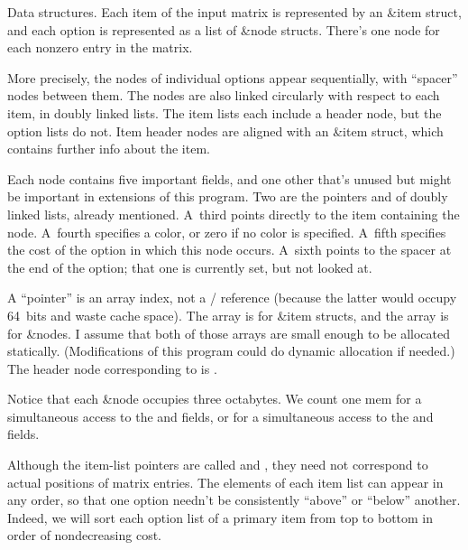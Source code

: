 Data structures.
Each item of the input matrix is represented by an \&{item} struct,
and each option is represented as a list of \&{node} structs. There's one
node for each nonzero entry in the matrix.

More precisely, the nodes of individual options appear sequentially,
with ``spacer'' nodes between them. The nodes are also
linked circularly with respect to each item, in doubly linked lists.
The item lists each include a header node, but the option lists do not.
Item header nodes are aligned with an \&{item} struct, which
contains further info about the item.

Each node contains five important fields, and one other that's unused but
might be important in extensions of this program. Two are the pointers 
and  of doubly linked lists, already mentioned.
A~third points directly to the item containing the node.
A~fourth specifies a color, or zero if no color is specified.
A~fifth specifies the cost of the option in which this node occurs.
A~sixth points to the spacer at the end of the option;
that one is currently set, but not looked at.

A ``pointer'' is an array index, not a \CEE/ reference (because the latter
would occupy 64~bits and waste cache space). The  array is for
\&{item} structs, and the  array is for \&{node}s. I assume that
both of
those arrays are small enough to be allocated statically. (Modifications
of this program could do dynamic allocation if needed.)
The header node corresponding to  is .

Notice that each \&{node} occupies three octabytes.
We count one mem for a simultaneous access to the  and 
fields,
or for a simultaneous access to the  and  fields.

Although the item-list pointers are called  and , they
need not
correspond to actual positions of matrix entries. The elements of
each item list can appear in any order, so that one option
needn't be consistently ``above'' or ``below'' another. Indeed, we
will sort each option list of a primary item from top to bottom in
order of nondecreasing cost.

